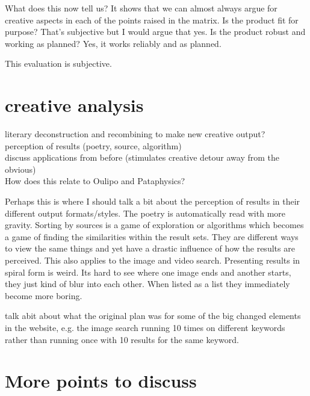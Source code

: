 \begin{draft}
  What does this now tell us? It shows that we can almost always argue for creative aspects in each of the points raised in the matrix. Is the product fit for purpose? That's subjective but I would argue that yes. Is the product robust and working as planned? Yes, it works reliably and as planned.

  This evaluation is subjective.
\end{draft}


\section{creative analysis}
\begin{draft}
  literary deconstruction and recombining to make new creative output? \\
  perception of results (poetry, source, algorithm) \\
  discuss applications from before (stimulates creative detour away from the obvious) \\

  How does this relate to Oulipo and Pataphysics? 

  Perhaps this is where I should talk a bit about the perception of results in their different output formats/styles. The poetry is automatically read with more gravity. Sorting by sources is a game of exploration or algorithms which becomes a game of finding the similarities within the result sets. They are different ways to view the same things and yet have a drastic influence of how the results are perceived. This also applies to the image and video search. Presenting results in spiral form is weird. Its hard to see where one image ends and another starts, they just kind of blur into each other. When listed as a list they immediately become more boring.

  talk abit about what the original plan was for some of the big changed elements in the website, e.g. the image search running 10 times on different keywords rather than running once with 10 results for the same keyword.
\end{draft}


\section{More points to discuss}


